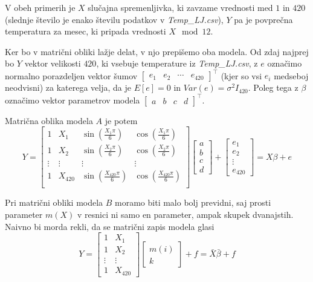 \documentclass[a4paper, 10pt]{article}
\begin{document}
	V obeh primerih je $X$ slučajna spremenljivka, ki zavzame vrednosti med $1$ in $420$ (slednje število je enako številu podatkov v \textit{Temp\_LJ.csv}), $Y$ pa je povprečna temperatura za mesec, ki pripada vrednosti $X\mod 12$.
	
	Ker bo v matrični obliki lažje delat, v njo prepišemo oba modela. Od zdaj najprej bo $Y$ vektor velikosti $420$, ki vsebuje temperature iz \textit{Temp\_LJ.csv}, z $e$ označimo normalno porazdeljen vektor šumov $\begin{bmatrix}
		e_1 & e_2 & \cdots & e_{420}
	\end{bmatrix}^{\top}$ (kjer so vsi $e_i$ medseboj neodvisni) za katerega velja, da je $E[e]=0$ in $Var(e) = \sigma^2 I_{420}$. Poleg tega z $\beta$ označimo vektor parametrov modela $\begin{bmatrix}
	a & b & c & d
	\end{bmatrix}^{\top}$.
	
	Matrična oblika modela $A$ je potem $$Y = \begin{bmatrix}
		1 & X_1 & \sin(\frac{X_1\pi}{6}) & \cos(\frac{X_1\pi}{6}) \\
		1 & X_2 & \sin(\frac{X_2\pi}{6}) & \cos(\frac{X_2\pi}{6}) \\
		\vdots & \vdots & \vdots & \vdots \\
		1 & X_{420} & \sin(\frac{X_{420}\pi}{6}) & \cos(\frac{X_{420}\pi}{6}) \\
	\end{bmatrix} \begin{bmatrix}
		a \\
		b \\
		c \\
		d
	\end{bmatrix} + \begin{bmatrix}
		e_1 \\
		e_2 \\
		\vdots \\
		e_{420}
	\end{bmatrix} = X\beta + e$$

	Pri matrični obliki modela $B$ moramo biti malo bolj previdni, saj prosti parameter $m(X)$ v resnici ni samo en parameter, ampak skupek dvanajstih. Naivno bi morda rekli, da se matrični zapis modela glasi $$Y = \begin{bmatrix} 
		1 & X_1 \\
		1 & X_2 \\
		\vdots & \vdots \\
		1 & X_{420}
	\end{bmatrix} \begin{bmatrix}
		m(i) \\
		k
	\end{bmatrix} + f = \bar{X}\bar{\beta} + f$$
\end{document}
